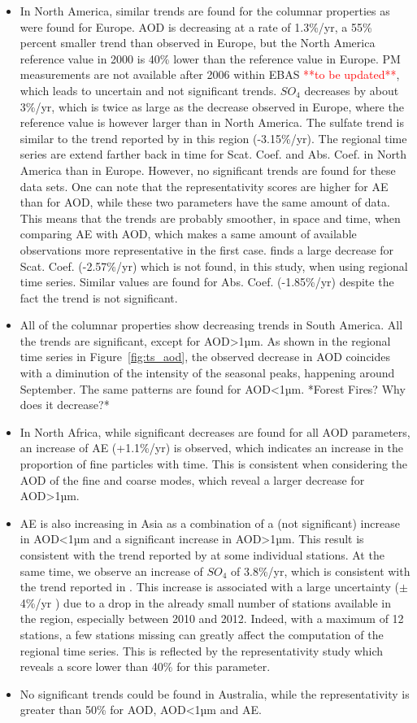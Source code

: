 \documentclass[journal abbreviation, manuscript]{copernicus}
\begin{document}
\begin{itemize}
 \item In North America, similar trends are found for the columnar properties as were found for Europe. AOD is decreasing at a rate of 1.3\%/yr, a 55\% percent smaller trend than observed in Europe, but the North America reference value in 2000 is 40\% lower than the reference value in Europe. PM measurements are not available after 2006 within EBAS \textcolor{red}{**to be updated**}, which leads to uncertain and not significant trends. $SO_{4}$ decreases by about 3\%/yr, which is twice as large as the decrease observed in Europe, where the reference value is however larger than in North America. The sulfate trend is similar to the trend reported by \cite{aas2019global} in this region (-3.15\%/yr). The regional time series are extend farther back in time for Scat. Coef. and Abs. Coef. in North America than in Europe. However, no significant trends are found for these data sets. One can note that the representativity scores are higher for AE than for AOD, while these two parameters have the same amount of data. This means that the trends are probably smoother, in space and time, when comparing AE with AOD, which makes a same amount of available observations more representative in the first case. \cite{collaudcoenprep} finds a large decrease for Scat. Coef. (-2.57\%/yr) which is not found, in this study, when using regional time series. Similar values are found for Abs. Coef. (-1.85\%/yr) despite the fact the trend is not significant.
 \item All of the columnar properties show decreasing trends in South America. All the trends are significant, except for AOD>1µm. As shown in the regional time series in Figure~\ref{fig:ts_aod}, the observed decrease in AOD coincides with a diminution of the intensity of the seasonal peaks, happening around September. The same patterns are found for AOD<1µm. *Forest Fires? Why does it decrease?*
 \item In North Africa, while significant decreases are found for all AOD parameters, an increase of AE (+1.1\%/yr) is observed, which indicates an increase in the proportion of fine particles with time. This is consistent when considering the AOD of the fine and coarse modes, which reveal a larger decrease for AOD>1µm.
 \item AE is also increasing in Asia as a combination of a (not significant) increase in AOD<1µm and a significant increase in AOD>1µm. This result is consistent with the trend reported by \cite{yoon2012trend} at some individual stations. At the same time, we observe an increase of $SO_{4}$ of 3.8\%/yr, which is consistent with the trend reported in \cite{aas2019global}. This increase is associated with a large uncertainty ($\pm$4\%/yr ) due to a drop in the already small number of stations available in the region, especially between 2010 and 2012. Indeed, with a maximum of 12 stations, a few stations missing can greatly affect the computation of the regional time series. This is reflected by the representativity study which reveals a score lower than 40\% for this parameter. 
 \item No significant trends could be found in Australia, while the representativity is greater than 50\% for AOD, AOD<1µm and AE.


\end{itemize}
\end{document}
